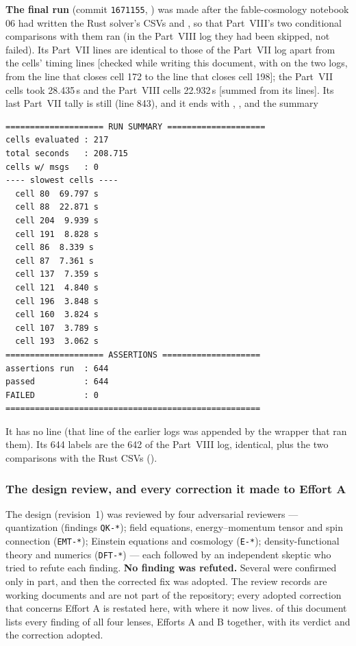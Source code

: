 \textbf{The final run} (commit \texttt{1671155}, ) was made
after the fable-cosmology notebook 06 had written the Rust solver's CSVs
 and , so that Part~VIII's two
conditional comparisons with them ran (in the Part~VIII log they had been skipped, not failed). Its
Part~VII lines are identical to those of the Part~VII log apart from the cells' timing lines [checked
while writing this document, with  on the two logs, from the line that closes cell 172 to
the line that closes cell 198]; the Part~VII cells took 28.435\,s and the Part~VIII cells 22.932\,s
[summed from its  lines]. Its last Part~VII tally is still
 (line 843), and it ends with
,
,
 and the summary
\begin{Verbatim}
==================== RUN SUMMARY ====================
cells evaluated : 217
total seconds   : 208.715
cells w/ msgs   : 0
---- slowest cells ----
  cell 80  69.797 s
  cell 88  22.871 s
  cell 204  9.939 s
  cell 191  8.828 s
  cell 86  8.339 s
  cell 87  7.361 s
  cell 137  7.359 s
  cell 121  4.840 s
  cell 196  3.848 s
  cell 160  3.824 s
  cell 107  3.789 s
  cell 193  3.062 s
==================== ASSERTIONS ====================
assertions run  : 644
passed          : 644
FAILED          : 0
====================================================
\end{Verbatim}
It has no  line (that line of the earlier logs was appended by the wrapper that ran
them). Its 644  labels are the 642 of the Part~VIII log, identical, plus the two
comparisons with the Rust CSVs ().

\subsubsection{The design review, and every correction it made to Effort A}
\label{sec:3.9.4}

The design (revision~1) was reviewed by four adversarial reviewers --- quantization (findings
\texttt{QK-*}); field equations, energy--momentum tensor and spin connection (\texttt{EMT-*}); Einstein
equations and cosmology (\texttt{E-*}); density-functional theory and numerics (\texttt{DFT-*}) ---
each followed by an independent skeptic who tried to refute each finding. \textbf{No finding was
refuted.} Several were confirmed only in part, and then the corrected fix was adopted. The review
records are working documents and are not part of the repository; every adopted correction that
concerns Effort A is restated here, with where it now lives.  of this
document lists every finding of all four lenses, Efforts A and B together, with its verdict
and the correction adopted.

